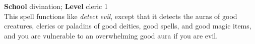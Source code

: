 \textbf{School} divination; \textbf{Level} cleric 1\\
This spell functions like \textit{detect evil}, except that it detects the auras of good creatures, clerics or paladins of good deities, good spells, and good magic items, and you are vulnerable to an overwhelming good aura if you are evil.\\
